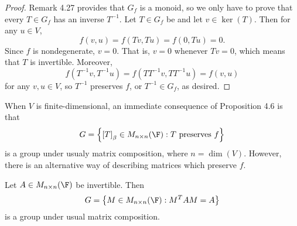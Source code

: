 \documentclass[linearalgebraII]{subfiles}
\begin{document}
    \begin{proof}
        Remark 4.27 provides that $G_f$ is a monoid, so we only have to prove that every $T\in G_f$ has an inverse $T^{-1}$. Let $T\in G_f$ be and let $v\in\ker(T)$. Then for any $u\in V$,
        \begin{equation*}
            f\left( v,u \right) = f\left( Tv, Tu \right) = f\left( 0, Tu \right) = 0.
        \end{equation*}
        Since $f$ is nondegenerate, $v=0$. That is, $v=0$ whenever $Tv = 0$, which means that $T$ is invertible. Moreover, 
        \begin{equation*}
            f\left( T^{-1}v, T^{-1}u \right) = f\left( TT^{-1}v, TT^{-1}u \right) = f\left( v,u \right) 
        \end{equation*}
        for any $v,u\in V$, so $T^{-1}$ preserves $f$, or $T^{-1}\in G_f$, as desired.
    \end{proof}

    \begin{remark}
        When $V$ is finite-dimensional, an immediate consequence of Proposition 4.6 is that
        \begin{equation*}
            G = \left\lbrace \left[ T \right] _\beta\in M_{n\times n}(\F): T\text{ preserves }f \right\rbrace 
        \end{equation*}
        is a group under usualy matrix composition, where $n=\dim(V)$. However, there is an alternative way of describing matrices which preserve $f$.
    \end{remark}

    \begin{cor}{}
        Let $A\in M_{n\times n}(\F)$ be invertible. Then
        \begin{equation*}
            G = \left\lbrace M\in M_{n\times n}(\F): M^TAM = A \right\rbrace 
        \end{equation*}
        is a group under usual matrix composition.
    \end{cor}	
\end{document}
